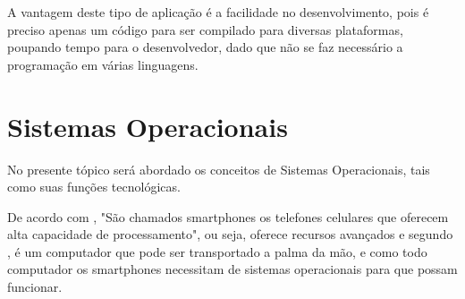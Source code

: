 A vantagem deste tipo de aplicação é a facilidade no desenvolvimento, pois é preciso apenas um código para ser compilado para diversas plataformas, poupando tempo para o  desenvolvedor, dado que não se faz necessário a programação em várias linguagens.







\section{Sistemas Operacionais}

No presente tópico será abordado os conceitos de Sistemas Operacionais, tais como suas funções tecnológicas.

De acordo com , "São chamados smartphones os telefones celulares que oferecem alta capacidade de processamento", ou seja, oferece recursos avançados e segundo , é um computador que pode ser transportado a palma da mão, e como todo computador os smartphones necessitam de sistemas operacionais para que possam funcionar.

